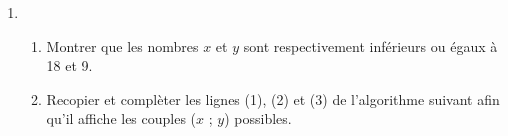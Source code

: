 \documentclass[10pt]{article}
\begin{document}
\medskip
 
\begin{enumerate}
\item 
	\begin{enumerate}
		\item Montrer que les nombres $x$ et $y$ sont respectivement inférieurs ou égaux à 18 et 9.		
		\item Recopier et complèter les lignes (1), (2) et (3) de l'algorithme suivant afin qu'il affiche les couples ($x$ ; $y$) possibles.

\begin{center}
\end{center}
%
		

\end{enumerate}
\end{enumerate}
\end{document}
